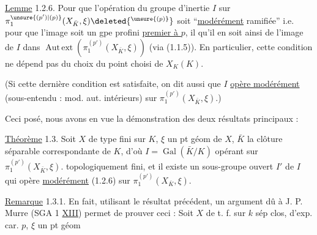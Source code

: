 \uline{Lemme} 1.2.6. Pour que l'opération  du groupe d'inertie $I$ sur $\pi_1^{\unsure{(p')|(p)}}(X_{\bar K},\xi)\deleted{^{\unsure{(p)}}}$ soit ``\uline{modérément} ramifiée'' i.e. pour que l'image  soit un gpe profini \uline{premier à $p$}, il  qu'il en soit ainsi de l'image de $I$ dans $\operatorname{Aut\,ext}(\pi_1^{(p')}(X_{\bar K},\xi))$ (via (1.1.5)). En particulier, cette condition ne dépend pas du choix du point  choisi de $X_K(K)$.

(Si cette dernière condition est satisfaite, on dit aussi que $I$ \uline{opère modérément} (sous-entendu : mod. aut. intérieurs) sur $\pi_1^{(p')}(X_{\bar K},\xi)$.)

Ceci posé, nous avons en vue la démonstration des deux résultats principaux :

\uline{Théorème} 1.3. 
Soit $X$ de type fini sur  $K$, $\xi$ un pt géom de $X$, $\bar K$ la clôture séparable correspondante de $K$, d'où $I=\operatorname{Gal}(\bar K/K)$ opérant  sur $\pi_1^{(p')}(X_{\bar K},\xi)$.
 topologiquement   fini, et  il existe un sous-groupe ouvert $I'$ de $I$ qui opère \uline{modérément} (1.2.6) sur $\pi_1^{(p')}(X_{\bar K},\xi)$.

\uline{Remarque} 1.3.1. En fait, utilisant le résultat précédent,    un argument dû à J. P. Murre (SGA 1 \uline{XIII}) permet de prouver ceci : Soit $X$ de t. f. sur $k$ sép clos,  d'exp. car. $p$, $\xi$ un pt géom
